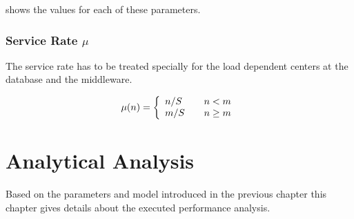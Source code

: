 \documentclass[a4paper, oneside]{csthesis}
\begin{document}
     shows the values for each of these parameters.


    \begin{table}[ht]
        \centering
        
        \begin{adjustbox}{center}
        \end{adjustbox}
        \caption{Parameter values for devices in the \telesto{} network model}
        \label{tbl:model-parameters}
    \end{table}

\subsection{Service Rate $\mu$}
The service rate has to be treated specially for the load dependent centers
at the database and the middleware.

\[ 
\mu(n) = \left\{ 
  \begin{array}{l l}
    n/S         & \quad n < m       \\
    m/S         & \quad n \geq m
  \end{array} \right.
\]

\chapter{Analytical Analysis}
Based on the parameters and model introduced in the previous chapter this
chapter gives details about the executed performance analysis.
\end{document}
